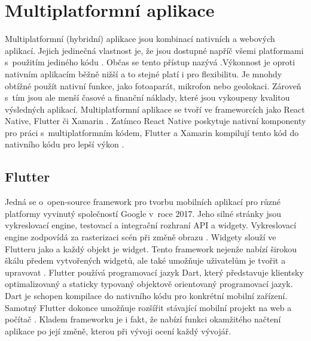 \section{Multiplatformní aplikace}
Multiplatformní (hybridní) aplikace jsou kombinací nativních a webových aplikací. Jejich jedinečná vlastnost je, že jsou dostupné napříč všemi platformami s~použitím jediného kódu \cite{mobiles}. Občas se tento přístup nazývá  \cite{mobilesibm} .Výkonnost je oproti nativním aplikacím běžně nižší a to stejné platí i pro flexibilitu. Je mnohdy obtížné použít nativní funkce, jako fotoaparát, mikrofon nebo geolokaci. Zároveň s~tím jsou ale menší časové a finanční náklady, které jsou vykoupeny kvalitou výsledných aplikací. Multiplatformní aplikace se tvoří ve frameworcích jako React Native, Flutter či Xamarin \cite{mobilesuptech}.  Zatímco React Native poskytuje nativní komponenty pro práci s~multiplatformním kódem, Flutter a Xamarin kompilují tento kód do nativního kódu pro lepší výkon \cite{mobilesamazon}. 
\subsection*{Flutter}
Jedná se o~open-source framework pro tvorbu mobilních aplikací pro různé platformy vyvinutý společností Google v~roce 2017.  Jeho silné stránky jsou vykreslovací engine, testovací a integrační rozhraní API a widgety. Vykreslovací engine zodpovídá za rasterizaci scén při změně obrazu \cite{flutter}. Widgety slouží ve Flutteru jako  a každý objekt je widget. Tento framework nejenže nabízí širokou škálu předem vytvořených widgetů, ale také umožňuje uživatelům je tvořit a upravovat \cite{flutter2}. Flutter používá programovací jazyk Dart, který představuje klientsky optimalizovaný a staticky typovaný objektově orientovaný programovací jazyk. Dart je schopen kompilace do nativního kódu pro konkrétní mobilní zařízení. Samotný Flutter dokonce umožňuje rozšířit stávající mobilní projekt na web a počítač \cite{flutter3}. Kladem frameworku je i fakt, že nabízí funkci okamžitého načtení aplikace po její změně, kterou při vývoji ocení každý vývojář.
